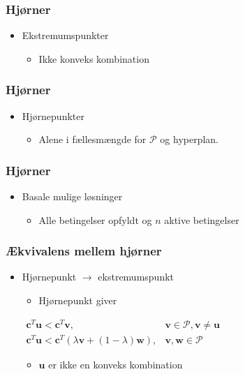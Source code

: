 %
\begin{frame}
\frametitle{Hjørner}
\begin{itemize}
\item Ekstremumspunkter
\begin{itemize}
\item Ikke konveks kombination
\end{itemize}
\end{itemize}
%

\end{frame}
%
%
\begin{frame}
\frametitle{Hjørner}
\begin{itemize}
\item Hjørnepunkter
\begin{itemize}
\item Alene i fællesmængde for $\mathcal{P}$ og hyperplan.
\end{itemize}
\end{itemize}
%

\end{frame}
%
%
\begin{frame}
\frametitle{Hjørner}
\begin{itemize}
\item Basale mulige løsninger
\begin{itemize}
\item Alle betingelser opfyldt og $n$ aktive betingelser
\end{itemize}
\end{itemize}
%

\end{frame}
%
%
\begin{frame}
\frametitle{Ækvivalens mellem hjørner}
\begin{itemize}
\item Hjørnepunkt $\rightarrow$ ekstremumspunkt
\begin{itemize}
%
\item Hjørnepunkt giver
\end{itemize}
%
\centering
$
\begin{array}{ll}
\textbf{c}^T\textbf{u} < \textbf{c}^T\textbf{v}, &\textbf{v}\in \mathcal{P}, \textbf{v} \neq \textbf{u}\\
\textbf{c}^T\textbf{u} < \textbf{c}^T(\lambda\textbf{v} + (1-\lambda)\textbf{w}), &\textbf{v},\textbf{w} \in \mathcal{P}
\end{array}
$
%
\begin{itemize}
\item $\textbf{u}$ er ikke en konveks kombination
\end{itemize}
\end{itemize}
%
\end{frame}
